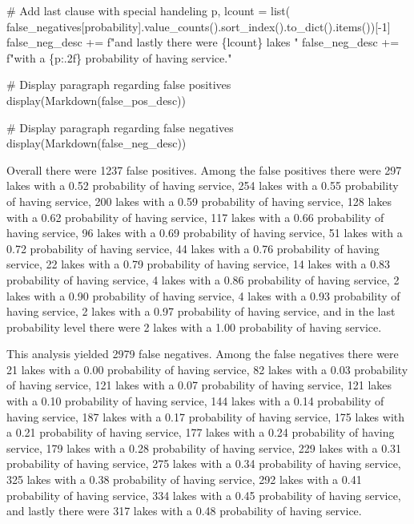 \documentclass[
]{article}
\newenvironment{Shaded}{\begin{snugshade}}{\end{snugshade}}
\newcommand{\BuiltInTok}[1]{\textcolor[rgb]{0.00,0.23,0.31}{#1}}
\newcommand{\CommentTok}[1]{\textcolor[rgb]{0.37,0.37,0.37}{#1}}
\newcommand{\DecValTok}[1]{\textcolor[rgb]{0.68,0.00,0.00}{#1}}
\newcommand{\NormalTok}[1]{\textcolor[rgb]{0.00,0.23,0.31}{#1}}
\newcommand{\OperatorTok}[1]{\textcolor[rgb]{0.37,0.37,0.37}{#1}}
\newcommand{\SpecialCharTok}[1]{\textcolor[rgb]{0.37,0.37,0.37}{#1}}
\newcommand{\SpecialStringTok}[1]{\textcolor[rgb]{0.13,0.47,0.30}{#1}}
\newcommand{\StringTok}[1]{\textcolor[rgb]{0.13,0.47,0.30}{#1}}
\begin{document}
\begin{Shaded}
\begin{Highlighting}[]
\CommentTok{\# Add last clause with special handeling}
\NormalTok{p, lcount }\OperatorTok{=} \BuiltInTok{list}\NormalTok{(}
\NormalTok{    false\_negatives[}\StringTok{\textquotesingle{}probability\textquotesingle{}}\NormalTok{].value\_counts().sort\_index().to\_dict().items())[}\OperatorTok{{-}}\DecValTok{1}\NormalTok{]}
\NormalTok{false\_neg\_desc }\OperatorTok{+=} \SpecialStringTok{f"and lastly there were }\SpecialCharTok{\{}\NormalTok{lcount}\SpecialCharTok{\}}\SpecialStringTok{ lakes "}
\NormalTok{false\_neg\_desc }\OperatorTok{+=} \SpecialStringTok{f"with a }\SpecialCharTok{\{}\NormalTok{p}\SpecialCharTok{:.2f\}}\SpecialStringTok{ probability of having service."}

\CommentTok{\# Display paragraph regarding false positives}
\NormalTok{display(Markdown(false\_pos\_desc))}

\CommentTok{\# Display paragraph regarding false negatives}
\NormalTok{display(Markdown(false\_neg\_desc))}
\end{Highlighting}
\end{Shaded}

Overall there were 1237 false positives. Among the false positives there
were 297 lakes with a 0.52 probability of having service, 254 lakes with
a 0.55 probability of having service, 200 lakes with a 0.59 probability
of having service, 128 lakes with a 0.62 probability of having service,
117 lakes with a 0.66 probability of having service, 96 lakes with a
0.69 probability of having service, 51 lakes with a 0.72 probability of
having service, 44 lakes with a 0.76 probability of having service, 22
lakes with a 0.79 probability of having service, 14 lakes with a 0.83
probability of having service, 4 lakes with a 0.86 probability of having
service, 2 lakes with a 0.90 probability of having service, 4 lakes with
a 0.93 probability of having service, 2 lakes with a 0.97 probability of
having service, and in the last probability level there were 2 lakes
with a 1.00 probability of having service.

This analysis yielded 2979 false negatives. Among the false negatives
there were 21 lakes with a 0.00 probability of having service, 82 lakes
with a 0.03 probability of having service, 121 lakes with a 0.07
probability of having service, 121 lakes with a 0.10 probability of
having service, 144 lakes with a 0.14 probability of having service, 187
lakes with a 0.17 probability of having service, 175 lakes with a 0.21
probability of having service, 177 lakes with a 0.24 probability of
having service, 179 lakes with a 0.28 probability of having service, 229
lakes with a 0.31 probability of having service, 275 lakes with a 0.34
probability of having service, 325 lakes with a 0.38 probability of
having service, 292 lakes with a 0.41 probability of having service, 334
lakes with a 0.45 probability of having service, and lastly there were
317 lakes with a 0.48 probability of having service.
\end{document}
